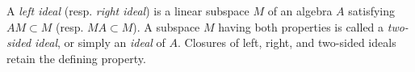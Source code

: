 A \emph{left ideal} (resp. \emph{right ideal}) is a linear subspace $M$ of an algebra $A$ satisfying $AM \subset M$ (resp. $MA \subset M$). A subspace $M$ having both properties is called a \emph{two-sided ideal}, or simply an \emph{ideal} of $A$. Closures of left, right, and two-sided ideals retain the defining property.
